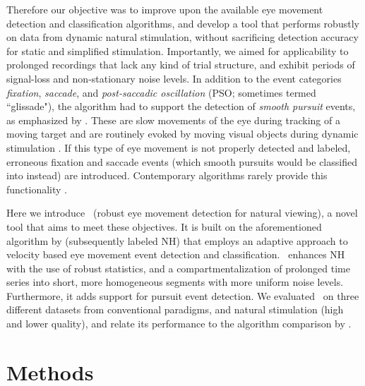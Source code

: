 Therefore our objective was to improve upon the available eye movement
detection and classification algorithms, and develop a tool that performs
robustly on data from dynamic natural stimulation, without sacrificing detection
accuracy for static and simplified stimulation. Importantly, we aimed for
applicability to prolonged recordings that lack any kind of trial structure,
and exhibit periods of signal-loss and non-stationary noise levels.
In addition to the event categories \textit{fixation}, \textit{saccade}, and
\textit{post-saccadic oscillation} (PSO; sometimes termed ``glissade"), the
algorithm had to support the detection of \textit{smooth pursuit} events, as
emphasized by \cite{Andersson2017}.  These are slow movements of the eye during
tracking of a moving target and are routinely evoked by moving visual objects
during dynamic stimulation \citep{carl1987pursuits}.  If this type of eye
movement is not properly detected and labeled, erroneous fixation and saccade
events (which smooth pursuits would be classified into instead) are introduced.
Contemporary algorithms rarely provide this functionality
\cite[but see \eg][for existing algorithms with
smooth pursuit detection]{LARSSON2015145,Komogortsev2013}.

Here we introduce \remodnav\ (robust eye movement detection for natural
viewing), a novel tool that aims to meet these objectives. It is built on the
aforementioned algorithm by \citet{Nystrom2010AnData} (subsequently labeled NH)
that employs an adaptive approach to velocity based eye movement event
detection and classification. \remodnav\ enhances NH with the use of robust
statistics, and a compartmentalization of prolonged time series into short,
more homogeneous segments with more uniform noise levels. Furthermore, it adds
support for pursuit event detection. We evaluated \remodnav\ on three different
datasets from conventional paradigms, and natural stimulation (high and lower
quality), and relate its performance to the algorithm comparison by
\cite{Andersson2017}.


\section*{Methods}\label{methods}



